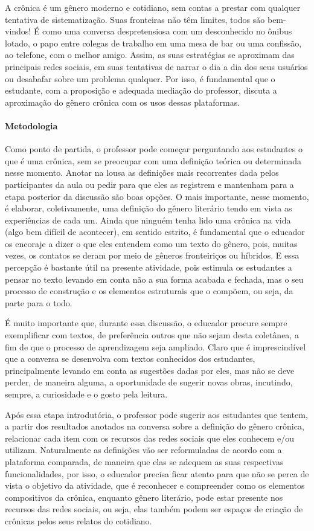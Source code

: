 \documentclass[12pt]{extarticle}
\begin{document}
A crônica é um gênero moderno e cotidiano, sem contas a prestar com
qualquer tentativa de sistematização. Suas fronteiras não têm limites,
todos são bem-vindos! É como uma conversa despretensiosa com um
desconhecido no ônibus lotado, o papo entre colegas de trabalho em uma
mesa de bar ou uma confissão, ao telefone, com o melhor amigo. Assim, as
suas estratégias se aproximam das principais redes sociais, em suas
tentativas de narrar o dia a dia dos seus usuários ou desabafar sobre um
problema qualquer. Por isso, é fundamental que o estudante, com a
proposição e adequada mediação do professor, discuta a aproximação do
gênero crônica com os usos dessas plataformas.

\paragraph{Metodologia} Como ponto de partida, o professor pode começar
perguntando aos estudantes o que é uma crônica, sem se preocupar com uma
definição teórica ou determinada nesse momento. Anotar na lousa as
definições mais recorrentes dada pelos participantes da aula ou pedir
para que eles as registrem e mantenham para a etapa posterior da
discussão são boas opções. O mais importante, nesse momento, é elaborar,
coletivamente, uma definição do gênero literário tendo em vista as
experiências de cada um. Ainda que ninguém tenha lido uma crônica na
vida (algo bem difícil de acontecer), em sentido estrito, é fundamental
que o educador os encoraje a dizer o que eles entendem como um texto do
gênero, pois, muitas vezes, os contatos se deram por meio de gêneros
fronteiriços ou híbridos. E essa percepção é bastante útil na presente
atividade, pois estimula os estudantes a pensar no texto levando em
conta não a sua forma acabada e fechada, mas o seu processo de
construção e os elementos estruturais que o compõem, ou seja, da parte
para o todo.

É muito importante que, durante essa discussão, o educador procure
sempre exemplificar com textos, de preferência outros que não sejam
desta coletânea, a fim de que o processo de aprendizagem seja ampliado.
Claro que é imprescindível que a conversa se desenvolva com textos
conhecidos dos estudantes, principalmente levando em conta as sugestões
dadas por eles, mas não se deve perder, de maneira alguma, a
oportunidade de sugerir novas obras, incutindo, sempre, a curiosidade e
o gosto pela leitura.

Após essa etapa introdutória, o professor pode sugerir aos estudantes
que tentem, a partir dos resultados anotados na conversa sobre a
definição do gênero crônica, relacionar cada item com os recursos das
redes sociais que eles conhecem e/ou utilizam. Naturalmente as
definições vão ser reformuladas de acordo com a plataforma comparada, de
maneira que elas se adequem as suas respectivas funcionalidades, por
isso, o educador precisa ficar atento para que não se perca de vista o
objetivo da atividade, que é reconhecer e compreender como os elementos
compositivos da crônica, enquanto gênero literário, pode estar presente
nos recursos das redes sociais, ou seja, elas também podem ser espaços
de criação de crônicas pelos seus relatos do cotidiano.
\end{document}
